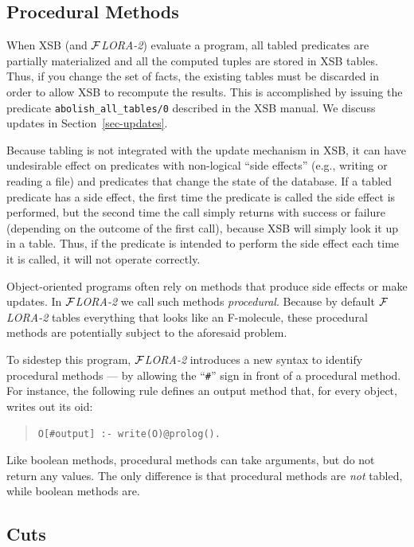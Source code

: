 \documentclass[11pt]{article}
\newcommand{\FLORA}{{\mbox{${\cal F}${\small\it LORA}\rm\emph{-2}}}\xspace}
\begin{document}
\subsection{Procedural Methods}\label{sec-proc-methods}

When XSB (and \FLORA) evaluate a program, all tabled predicates are
partially materialized and all the computed tuples are stored in XSB
tables. Thus, if you change the set of facts, the existing tables must be
discarded in order to allow XSB to recompute the results. This is
accomplished by issuing the predicate {\tt abolish\_all\_tables/0}
described in the XSB manual. We discuss updates in
Section~\ref{sec-updates}.

%
Because tabling is not integrated with the update mechanism in XSB, it can
have undesirable effect on predicates with non-logical ``side effects''
(e.g., writing or reading a file) and predicates that change the state of
the database.  If a tabled predicate has a side effect, the first time the
predicate is called the side effect is performed, but the second time the
call simply returns with success or failure (depending on the outcome of
the first call), because XSB will simply look it up in a table.  Thus, if
the predicate is intended to perform the side effect each time it is
called, it will not operate correctly.

Object-oriented programs often rely on methods that produce side effects
or make updates.  In \FLORA we call such methods \emph{procedural}.
Because by default \FLORA tables everything that looks like an F-molecule,
these procedural methods are potentially subject to the aforesaid problem.

To sidestep this program, \FLORA introduces a new syntax to identify
procedural methods --- by allowing the ``\verb|#|'' sign in front of a
procedural method. For instance, the following rule defines an output
method that, for every object, writes out its oid:
\begin{quote}
\verb|O[#output] :- write(O)@prolog().|
\end{quote}
Like boolean methods, procedural methods can take arguments, but do not
return any values.  The only difference is that procedural methods are
\emph{not} tabled, while boolean methods are.


\subsection{Cuts}
\end{document}

